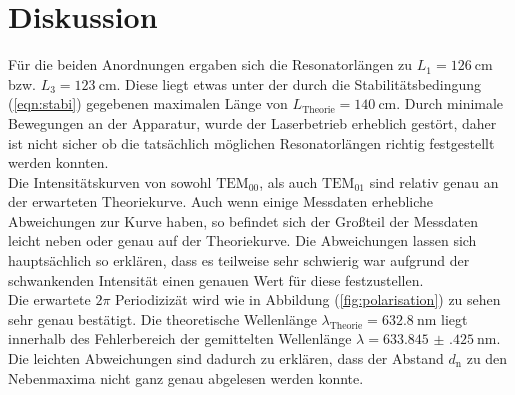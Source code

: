\section{Diskussion}
\label{sec:Diskussion}
Für die beiden Anordnungen ergaben sich die Resonatorlängen zu $L_\mathrm{1}=\SI{126}{\centi\meter}$ bzw. $L_\mathrm{3} = \SI{123}{\centi\meter}$. Diese liegt etwas unter der durch die Stabilitätsbedingung (\ref{eqn:stabi}) gegebenen
maximalen Länge von $L_\mathrm{Theorie}=\SI{140}{\centi\meter}$. Durch minimale Bewegungen an der Apparatur, wurde der Laserbetrieb erheblich gestört, daher ist nicht sicher ob die tatsächlich möglichen Resonatorlängen richtig festgestellt werden konnten. \\
Die Intensitätskurven von sowohl $\mathrm{TEM}_\mathrm{00}$, als auch  $\mathrm{TEM}_\mathrm{01}$ sind relativ genau an der erwarteten Theoriekurve. Auch wenn einige Messdaten erhebliche Abweichungen zur Kurve haben, so befindet sich der Großteil der Messdaten leicht neben oder genau auf der Theoriekurve. Die Abweichungen lassen sich hauptsächlich so erklären, dass es teilweise sehr schwierig war aufgrund der schwankenden Intensität einen genauen Wert für diese festzustellen. \\
Die erwartete $2\pi$ Periodizizät wird wie in Abbildung (\ref{fig:polarisation}) zu sehen sehr genau bestätigt. Die theoretische Wellenlänge $\lambda_\mathrm{Theorie}=\SI{632.8}{\nano\meter}$ liegt innerhalb des Fehlerbereich der gemittelten Wellenlänge $\lambda=\SI{633.845(425)}{\nano\meter}$. Die leichten Abweichungen sind dadurch zu erklären, dass der Abstand $d_\mathrm{n}$ zu den Nebenmaxima nicht ganz genau abgelesen werden konnte.
